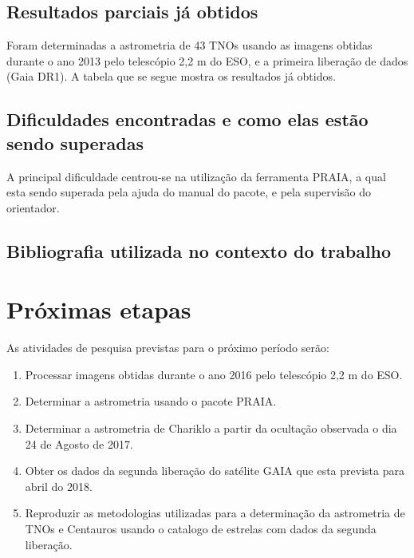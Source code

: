 \documentclass[a4paper, 11pt]{article}
\begin{document}
\subsection{Resultados parciais já obtidos}
Foram determinadas a astrometria de 43 TNOs usando as imagens obtidas durante o ano 2013 pelo telescópio 2,2 m do ESO, e a primeira liberação de dados (Gaia DR1). A tabela que se segue mostra os resultados já obtidos.  
\subsection{Dificuldades encontradas e como elas estão sendo superadas}
A principal dificuldade centrou-se na utilização da ferramenta PRAIA, a qual esta sendo superada pela ajuda do manual do pacote, e pela supervisão do orientador.  

\subsection{Bibliografia utilizada no contexto do trabalho}

\section{Pr\'oximas etapas}

As atividades de pesquisa previstas para o pr\'oximo per\'iodo ser\~ao:

\begin{enumerate}
\item Processar imagens obtidas durante o ano 2016 pelo telescópio 2,2 m do ESO.
\item Determinar a astrometria usando o pacote PRAIA. 
\item Determinar a astrometria de Chariklo a partir da ocultação observada o dia 24 de Agosto de 2017. 
\item Obter os dados da segunda liberação do satélite GAIA que esta prevista para abril do 2018.
\item Reproduzir as metodologias utilizadas para a determinação da astrometria de TNOs e Centauros usando o catalogo de estrelas com dados da segunda liberação.
\end{enumerate}
\end{document}
